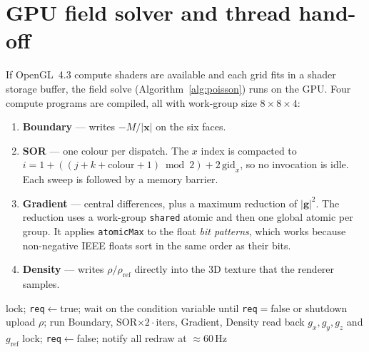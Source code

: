 \documentclass[12pt]{article}
\newcommand{\vect}[1]{\mathbf{#1}}
\begin{document}
\section{GPU field solver and thread hand-off}
\label{sec:gpu}

If OpenGL~4.3 compute shaders are available and each grid fits in a shader
storage buffer, the field solve (Algorithm~\ref{alg:poisson}) runs on the GPU.
Four compute programs are compiled, all with work-group size $8\times8\times4$:

\begin{enumerate}
  \item \textbf{Boundary} --- writes $-M/|\vect x|$ on the six faces.
  \item \textbf{SOR} --- one colour per dispatch. The $x$ index is compacted to
        $i=1+((j+k+\text{colour}+1)\bmod2)+2\,\text{gid}_x$, so no invocation
        is idle. Each sweep is followed by a memory barrier.
  \item \textbf{Gradient} --- central differences, plus a maximum reduction of $|\vect g|^2$.
        The reduction uses a work-group \texttt{shared} atomic and then one global atomic per group.
        It applies \texttt{atomicMax} to the float \emph{bit patterns}, which works because
        non-negative IEEE floats sort in the same order as their bits.
  \item \textbf{Density} --- writes $\rho/\rho_\text{ref}$ directly into the 3D
        texture that the renderer samples.
\end{enumerate}

\begin{algorithm}[htbp]
\caption{Simulation thread $\leftrightarrow$ GL thread hand-off}
\begin{algorithmic}[1]
 
  \State lock; \texttt{req}$\gets$true; wait on the condition variable until \texttt{req}$=$false or shutdown
\EndProcedure
{} 
     \State upload $\rho$; run Boundary, SOR$\times2\cdot$iters, Gradient, Density
     \State read back $g_x,g_y,g_z$ and $g_\text{ref}$
     \State lock; \texttt{req}$\gets$false; notify all
  \EndIf
  \State redraw at $\approx60$\,Hz
\EndProcedure
\end{algorithmic}
\end{algorithm}
\end{document}
